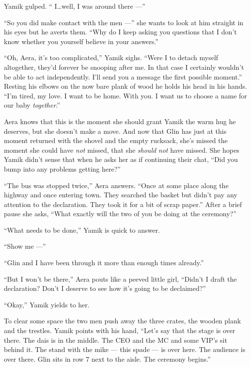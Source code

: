 \documentclass[twoside,11pt,openany]{book}
\begin{document}
Yamik gulped. `` I{\ldots}well, I was around there ---''

``So you did make contact with the men ---'' she wants to look at
him{ }straight in his eyes but he averts them. ``Why do I keep
asking you questions that I don't know whether you yourself believe in your answers.''

``Oh, Aera, it's too complicated,'' Yamik sighs. ``Were I to detach myself
altogether, they'd forever be snooping after me. In that case I certainly wouldn't be able to act independently. I'll
send you a message the first possible moment.'' Resting his elbows on the now bare plank of wood he holds
his head in his hands. ``I'm tired, my love. I want to be home. With you. I want
us{ }to choose a name for our baby \textit{together}.''

Aera knows that this is the moment she should grant Yamik the warm hug he deserves, but she doesn't make a move. And
now that Glin has just at this moment returned with the shovel and the empty rucksack, she's missed the moment she
could have \textit{not} missed, that she \textit{should} \textit{not} have missed. She hopes Yamik didn't sense that
when he asks her as if continuing their chat, ``Did you bump into any problems getting
here?''

``The bus was stopped twice,'' Aera answers. ``Once at some place along the
highway and once entering town. They searched the basket but didn't pay any attention to the declaration. They took it
for a bit of scrap paper.'' After a brief pause she asks, ``What exactly will the two of you
be doing at the ceremony?''

``What needs to be done,'' Yamik is quick to answer.

``Show me ---''

``Glin and I have been through it more than enough times already.''

``But I won't be there,'' Aera pouts like a peeved little girl, ``Didn't I
draft the declaration? Don't I deserve to see how it's going to be declaimed?''

``Okay,'' Yamik yields to her.

To clear some space the two  men push away the three crates, the wooden plank and the
trestles{.} Yamik points with his hand, ``Let's say that the stage
is over there. The dais is in the middle. The CEO and the MC and some VIP's sit behind it. The stand with the mike
--- this spade --- is over here. The audience is over there. Glin sits in row 7 next to the aisle. The ceremony
begins.''
\end{document}
